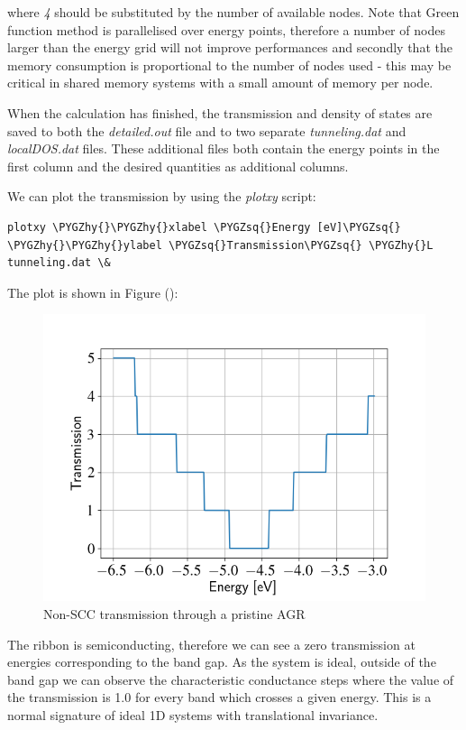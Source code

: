 \documentclass[a4paper,11pt,english]{sphinxmanual}
\def\PYGZhy{\char`\-}
\def\PYGZsq{\char`\'}
\renewcommand\PYGZsq{\textquotesingle}
\begin{document}
{{where \emph{4} should be substituted by the number of available nodes. Note
that Green function method is parallelised over energy points, therefore a number of
nodes larger than the energy grid will not improve performances and
secondly that the memory consumption is proportional to the number of
nodes used - this may be critical in shared memory systems with a
small amount of memory per node.

When the calculation has finished, the transmission and density of
states are saved to both the \emph{detailed.out} file and to two separate
\emph{tunneling.dat} and \emph{localDOS.dat} files. These additional files both
contain the energy points in the first column and the desired
quantities as additional columns.

We can plot the transmission by using the \emph{plotxy} script:

\begin{Verbatim}[commandchars=\\\{\}]
plotxy \PYGZhy{}\PYGZhy{}xlabel \PYGZsq{}Energy [eV]\PYGZsq{} \PYGZhy{}\PYGZhy{}ylabel \PYGZsq{}Transmission\PYGZsq{} \PYGZhy{}L tunneling.dat \&
\end{Verbatim}

The plot is shown in Figure {\hyperref[transport:fig-nonscc-tunn]{\emph{}}} ():
\begin{figure}[htbp]
\centering
\capstart
\includegraphics[width=0.700\linewidth]{nonscc-tunn.png}
\caption{Non-SCC transmission through a pristine AGR}\label{transport:fig-nonscc-tunn}\end{figure}

The ribbon is semiconducting, therefore we can see a zero transmission
at energies corresponding to the band gap. As the system is ideal,
outside of the band gap we can observe the characteristic conductance
steps where the value of the transmission is 1.0 for every band which
crosses a given energy. This is a normal signature of ideal 1D systems
with translational invariance.

}}
\end{document}
